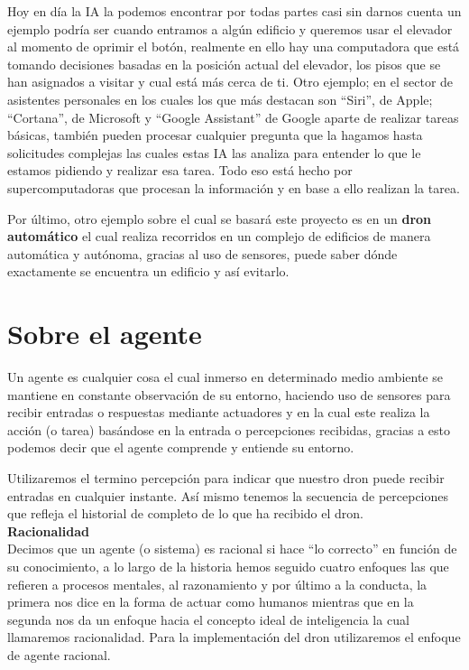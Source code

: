 \documentclass[12pt]{article}
\begin{document}
Hoy en día la IA la podemos encontrar por todas partes casi sin darnos cuenta un ejemplo
podría ser cuando entramos a algún edificio y queremos usar el elevador al momento de oprimir el
botón, realmente en ello hay una computadora que está tomando decisiones basadas en la posición
actual del elevador, los pisos que se han asignados a visitar y cual está más cerca de ti. Otro ejemplo;
en el sector de asistentes personales en los cuales los que más destacan son “Siri”, de Apple;
“Cortana”, de Microsoft y “Google Assistant” de Google aparte de realizar tareas básicas, también
pueden procesar cualquier pregunta que la hagamos hasta solicitudes complejas las cuales estas IA
las analiza para entender lo que le estamos pidiendo y realizar esa tarea. Todo eso está hecho por
supercomputadoras que procesan la información y en base a ello realizan la tarea.

Por último, otro ejemplo sobre el cual se basará este proyecto es en un \textbf{dron automático} el cual
realiza recorridos en un complejo de edificios de manera automática y autónoma, gracias al uso de sensores, puede saber dónde exactamente se encuentra un edificio y
así evitarlo.

\section{Sobre el agente}
Un agente es cualquier cosa el cual inmerso en determinado medio ambiente se mantiene en
constante observación de su entorno, haciendo uso de sensores para recibir entradas o respuestas
mediante actuadores y en la cual este realiza la acción (o tarea) basándose en la entrada o
percepciones recibidas, gracias a esto podemos decir que el agente comprende y entiende su
entorno.

Utilizaremos el termino percepción para indicar que nuestro dron puede recibir entradas
en cualquier instante. Así mismo tenemos la secuencia de percepciones que refleja el historial de
completo de lo que ha recibido el dron.\\


\textbf{Racionalidad}\\

Decimos que un agente (o sistema) es racional si hace “lo correcto” en función de su
conocimiento, a lo largo de la historia hemos seguido cuatro enfoques las que refieren a
procesos mentales, al razonamiento y por último a la conducta, la primera nos dice en la forma
de actuar como humanos mientras que en la segunda nos da un enfoque hacia el concepto
ideal de inteligencia la cual llamaremos racionalidad. Para la implementación del dron
utilizaremos el enfoque de agente racional.\\
\end{document}
